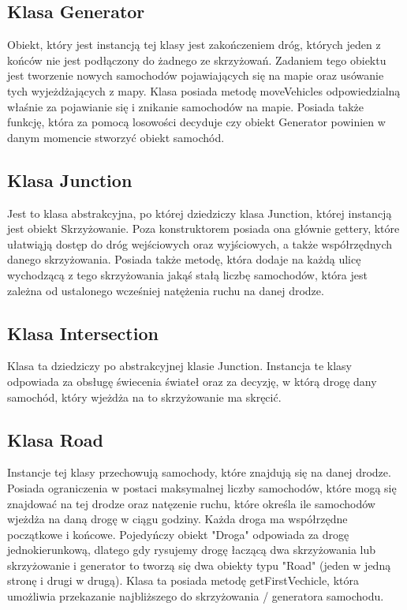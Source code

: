 \documentclass{article}
\begin{document}
\subsection{Klasa Generator}
    Obiekt, który jest instancją tej klasy jest zakończeniem dróg, których jeden z końców nie jest podłączony do żadnego ze skrzyżowań. Zadaniem tego obiektu jest tworzenie nowych samochodów pojawiających się na mapie oraz usówanie tych wyjeżdżających z mapy. Klasa posiada metodę moveVehicles odpowiedzialną właśnie za pojawianie się i znikanie samochodów na mapie. Posiada także funkcję, która za pomocą losowości decyduje czy obiekt Generator powinien w danym momencie stworzyć obiekt samochód.

\subsection{Klasa Junction}
    Jest to klasa abstrakcyjna, po której dziedziczy klasa Junction, której instancją jest obiekt Skrzyżowanie. Poza konstruktorem posiada ona głównie gettery, które ułatwiąją dostęp do dróg wejściowych oraz wyjściowych, a także współrzędnych danego skrzyżowania. Posiada także metodę, która dodaje na każdą ulicę wychodzącą z tego skrzyżowania jakąś stałą liczbę samochodów, która jest zależna od ustalonego wcześniej natężenia ruchu na danej drodze.

\subsection{Klasa Intersection}
    Klasa ta dziedziczy po abstrakcyjnej klasie Junction. Instancja te klasy odpowiada za obsługę świecenia świateł oraz za decyzję, w którą drogę dany samochód, który wjeżdża na to skrzyżowanie ma skręcić. 

\subsection{Klasa Road}
    Instancje tej klasy przechowują samochody, które znajdują się na danej drodze. Posiada ograniczenia w postaci maksymalnej liczby samochodów, które mogą się znajdować na tej drodze oraz natęzenie ruchu, które określa ile samochodów wjeżdża na daną drogę w ciągu godziny. Każda droga ma współrzędne początkowe i końcowe. Pojedyńczy obiekt "Droga" odpowiada za drogę jednokierunkową, dlatego gdy rysujemy drogę łaczącą dwa skrzyżowania lub skrzyżowanie i generator to tworzą się dwa obiekty typu "Road" (jeden w jedną stronę i drugi w drugą). Klasa ta posiada metodę getFirstVechicle, która umożliwia przekazanie najbliższego do skrzyżowania / generatora samochodu.
\end{document}
